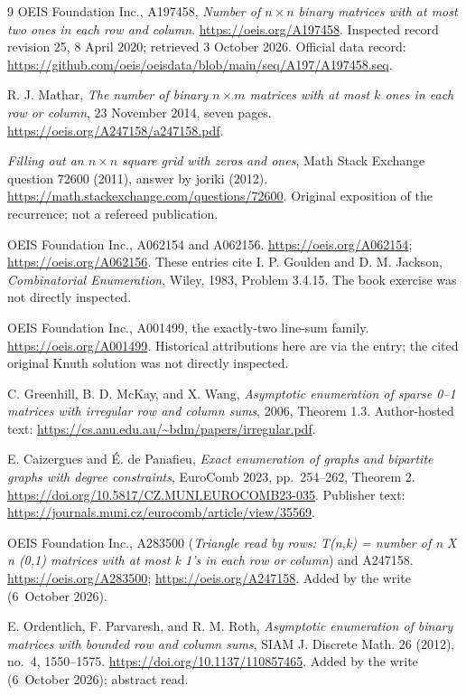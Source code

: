 \documentclass[11pt,letterpaper]{article}
\numberwithin{equation}{section}
\theoremstyle{remark}\newtheorem{remark}[theorem]{Remark}
\begin{document}
\begin{thebibliography}{9}
OEIS Foundation Inc., A197458, \emph{Number of $n\times n$ binary
matrices with at most two ones in each row and column}.
\url{https://oeis.org/A197458}.
Inspected record revision 25, 8 April 2020; retrieved 3 October 2026.
Official data record:
\url{https://github.com/oeis/oeisdata/blob/main/seq/A197/A197458.seq}.

R. J. Mathar, \emph{The number of binary $n\times m$ matrices with at
most $k$ ones in each row or column}, 23 November 2014, seven pages.
\url{https://oeis.org/A247158/a247158.pdf}.

\emph{Filling out an $n\times n$ square grid with zeros and ones},
Math Stack Exchange question 72600 (2011), answer by joriki (2012).
\url{https://math.stackexchange.com/questions/72600}.
Original exposition of the recurrence; not a refereed publication.

OEIS Foundation Inc., A062154 and A062156.
\url{https://oeis.org/A062154}; \url{https://oeis.org/A062156}.
These entries cite I. P. Goulden and D. M. Jackson,
\emph{Combinatorial Enumeration}, Wiley, 1983, Problem 3.4.15.
The book exercise was not directly inspected.

OEIS Foundation Inc., A001499, the exactly-two line-sum family.
\url{https://oeis.org/A001499}.
Historical attributions here are via the entry; the cited original
Knuth solution was not directly inspected.

C. Greenhill, B. D. McKay, and X. Wang,
\emph{Asymptotic enumeration of sparse 0--1 matrices with irregular
row and column sums}, 2006, Theorem 1.3.
Author-hosted text: \url{https://cs.anu.edu.au/~bdm/papers/irregular.pdf}.

E. Caizergues and \'E. de Panafieu,
\emph{Exact enumeration of graphs and bipartite graphs with degree
constraints}, EuroComb 2023, pp.~254--262, Theorem 2.
\url{https://doi.org/10.5817/CZ.MUNI.EUROCOMB23-035}.
Publisher text: \url{https://journals.muni.cz/eurocomb/article/view/35569}.

OEIS Foundation Inc., A283500 (\emph{Triangle read by rows: T(n,k) = number
of n X n (0,1) matrices with at most k 1's in each row or column}) and
A247158. \url{https://oeis.org/A283500}; \url{https://oeis.org/A247158}.
Added by the write (6~October 2026).

E. Ordentlich, F. Parvaresh, and R. M. Roth,
\emph{Asymptotic enumeration of binary matrices with bounded row and column
sums}, SIAM J. Discrete Math. 26 (2012), no.~4, 1550--1575.
\url{https://doi.org/10.1137/110857465}.
Added by the write (6~October 2026); abstract read.
\end{thebibliography}
\end{document}
